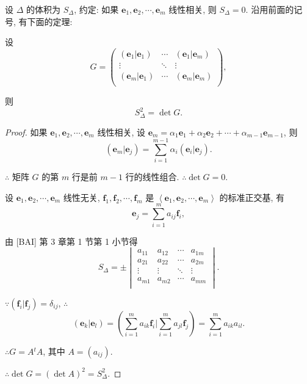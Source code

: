 \documentclass[color=black,device=normal,lang=cn,mode=geye]{elegantnote}
\begin{document}
设 $\Delta$ 的体积为 $S_\Delta$, 约定: 如果 $\boldsymbol{e}_1,\boldsymbol{e}_2,\cdots,\boldsymbol{e}_m$ 线性相关, 则 $S_\Delta=0$. 沿用前面的记号, 有下面的定理:
\begin{theorem}\label{t2.3}
    设
    \[G=\begin{pmatrix}
        (\boldsymbol{e}_1|\boldsymbol{e}_1) & \cdots & (\boldsymbol{e}_1|\boldsymbol{e}_m) \\
        \vdots & \ddots & \vdots \\
        (\boldsymbol{e}_m|\boldsymbol{e}_1) & \cdots & (\boldsymbol{e}_m|\boldsymbol{e}_m) \\
    \end{pmatrix},\]

    则
    \[S^2_\Delta=\det G.\]
\end{theorem}
\begin{proof}
    如果 $\boldsymbol{e}_1,\boldsymbol{e}_2,\cdots,\boldsymbol{e}_m$ 线性相关, 设 $\boldsymbol{e}_m=\alpha_1\boldsymbol{e}_1+\alpha_2\boldsymbol{e}_2+\cdots+\alpha_{m-1}\boldsymbol{e}_{m-1}$, 则
    \[(\boldsymbol{e}_m|\boldsymbol{e}_j)=\sum\limits_{i=1}^{m-1}\alpha_i(\boldsymbol{e}_i|\boldsymbol{e}_j).\]
    
    $\therefore$ 矩阵 $G$ 的第 $m$ 行是前 $m-1$ 行的线性组合. $\therefore\det G=0$.

    设 $\boldsymbol{e}_1,\boldsymbol{e}_2,\cdots,\boldsymbol{e}_m$ 线性无关, $\boldsymbol{f}_1,\boldsymbol{f}_2,\cdots,\boldsymbol{f}_m$ 是 $\left<\boldsymbol{e}_1,\boldsymbol{e}_2,\cdots,\boldsymbol{e}_m\right>$ 的标准正交基, 有
    \[\boldsymbol{e}_j=\sum\limits_{i=1}^ma_{ij}\boldsymbol{f}_i,\]

    由 [BAI] 第 3 章第 1 节第 1 小节得
    \[S_\Delta=\pm\begin{vmatrix}
        a_{11} & a_{12} & \cdots & a_{1m} \\
        a_{21} & a_{22} & \cdots & a_{2m} \\
        \vdots & \vdots & \ddots & \vdots \\
        a_{m1} & a_{m2} & \cdots & a_{mm} \\
    \end{vmatrix}.\]

    $\because(\boldsymbol{f}_i|\boldsymbol{f}_j)=\delta_{ij}$, $\therefore$
    \[(\boldsymbol{e}_k|\boldsymbol{e}_l)=\left(\sum\limits_{i=1}^ma_{ik}\boldsymbol{f}_i\bigg|\sum\limits_{i=1}^ma_{jl}\boldsymbol{f}_j\right)=\sum\limits_{i=1}^ma_{ik}a_{il}.\]

    $\therefore G=A{}^tA$, 其中 $A=(a_{ij})$.

    $\therefore\det G=(\det A)^2=S_\Delta^2$.
\end{proof}
\end{document}
